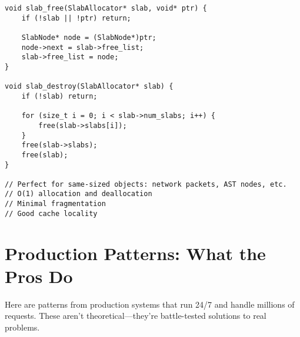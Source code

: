 \begin{lstlisting}
void slab_free(SlabAllocator* slab, void* ptr) {
    if (!slab || !ptr) return;

    SlabNode* node = (SlabNode*)ptr;
    node->next = slab->free_list;
    slab->free_list = node;
}

void slab_destroy(SlabAllocator* slab) {
    if (!slab) return;

    for (size_t i = 0; i < slab->num_slabs; i++) {
        free(slab->slabs[i]);
    }
    free(slab->slabs);
    free(slab);
}

// Perfect for same-sized objects: network packets, AST nodes, etc.
// O(1) allocation and deallocation
// Minimal fragmentation
// Good cache locality
\end{lstlisting}

\section{Production Patterns: What the Pros Do}

Here are patterns from production systems that run 24/7 and handle millions of requests. These aren't theoretical—they're battle-tested solutions to real problems.

